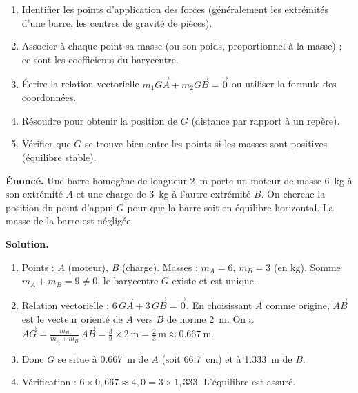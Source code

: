 \documentclass[11pt]{article}
\begin{document}
\begin{methode}
\begin{enumerate}
\item Identifier les points d'application des forces (généralement les extrémités d'une barre, les centres de gravité de pièces).
\item Associer à chaque point sa masse (ou son poids, proportionnel à la masse) ; ce sont les coefficients du barycentre.
\item Écrire la relation vectorielle $m_1\overrightarrow{GA}+m_2\overrightarrow{GB}=\vec{0}$ ou utiliser la formule des coordonnées.
\item Résoudre pour obtenir la position de $G$ (distance par rapport à un repère).
\item Vérifier que $G$ se trouve bien entre les points si les masses sont positives (équilibre stable).
\end{enumerate}
\end{methode}

\begin{exoresolu}
\textbf{Énoncé.} Une barre homogène de longueur \SI{2}{\meter} porte un moteur de masse \SI{6}{\kilo\gram} à son extrémité $A$ et une charge de \SI{3}{\kilo\gram} à l'autre extrémité $B$. On cherche la position du point d'appui $G$ pour que la barre soit en équilibre horizontal. La masse de la barre est négligée.

\textbf{Solution.}
\begin{enumerate}
\item Points : $A$ (moteur), $B$ (charge). Masses : $m_A=6$, $m_B=3$ (en kg). Somme $m_A+m_B=9\neq0$, le barycentre $G$ existe et est unique.
\item Relation vectorielle : $6\,\overrightarrow{GA}+3\,\overrightarrow{GB}=\vec{0}$.
  En choisissant $A$ comme origine, $\overrightarrow{AB}$ est le vecteur orienté de $A$ vers $B$ de norme \SI{2}{\meter}.
  On a $\overrightarrow{AG}= \frac{m_B}{m_A+m_B}\,\overrightarrow{AB}= \frac{3}{9}\times\SI{2}{\meter}= \frac{2}{3}\,\text{m} \approx \SI{0,667}{\meter}$.
\item Donc $G$ se situe à \SI{0,667}{\meter} de $A$ (soit \SI{66,7}{\centi\meter}) et à \SI{1,333}{\meter} de $B$.
\item Vérification : $6\times0,667 \approx 4,0 = 3\times1,333$. L'équilibre est assuré.
\end{enumerate}
\end{exoresolu}
\end{document}
